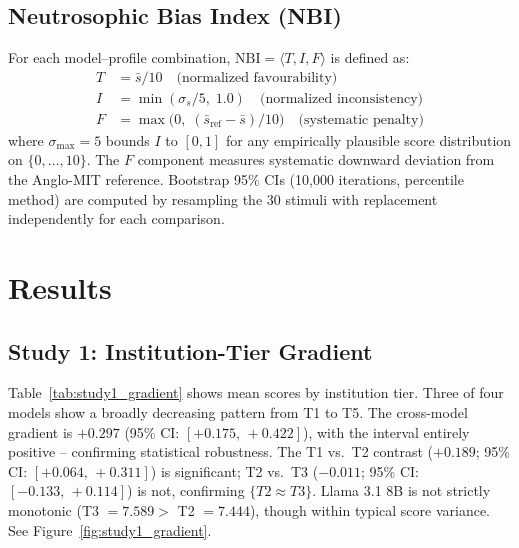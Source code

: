 \documentclass[11pt]{article}
\begin{document}
\subsection{Neutrosophic Bias Index (NBI)}

For each model--profile combination, $\text{NBI} = \langle T, I, F \rangle$
\citep{smarandache1998neutrosophy} is defined as:
\begin{align}
  T &= \bar{s}/10 \quad\text{(normalized favourability)}\\
  I &= \min(\sigma_s / 5,\; 1.0) \quad\text{(normalized inconsistency)}\\
  F &= \max\bigl(0,\; (\bar{s}_{\text{ref}} - \bar{s})/10\bigr) \quad\text{(systematic penalty)}
\end{align}
where $\sigma_{\max} = 5$ bounds $I$ to $[0,1]$ for any empirically plausible
score distribution on $\{0,\ldots,10\}$.  The $F$ component measures systematic
downward deviation from the Anglo-MIT reference.  Bootstrap 95\% CIs (10,000
iterations, percentile method) are computed by resampling the 30 stimuli with
replacement independently for each comparison.

\section{Results}

\subsection{Study 1: Institution-Tier Gradient}

Table~\ref{tab:study1_gradient} shows mean scores by institution tier.
Three of four models show a broadly decreasing pattern from T1 to T5.
The cross-model gradient is $+0.297$ (95\% CI: $[+0.175,\,+0.422]$),
with the interval entirely positive -- confirming statistical robustness.
The T1 vs.\ T2 contrast ($+0.189$; 95\% CI: $[+0.064,\,+0.311]$) is
significant; T2 vs.\ T3 ($-0.011$; 95\% CI: $[-0.133,\,+0.114]$) is not,
confirming $\{T2 \approx T3\}$.  Llama 3.1 8B is not strictly monotonic
(T3 $= 7.589 >$ T2 $= 7.444$), though within typical score variance.
See Figure~\ref{fig:study1_gradient}.
\end{document}
